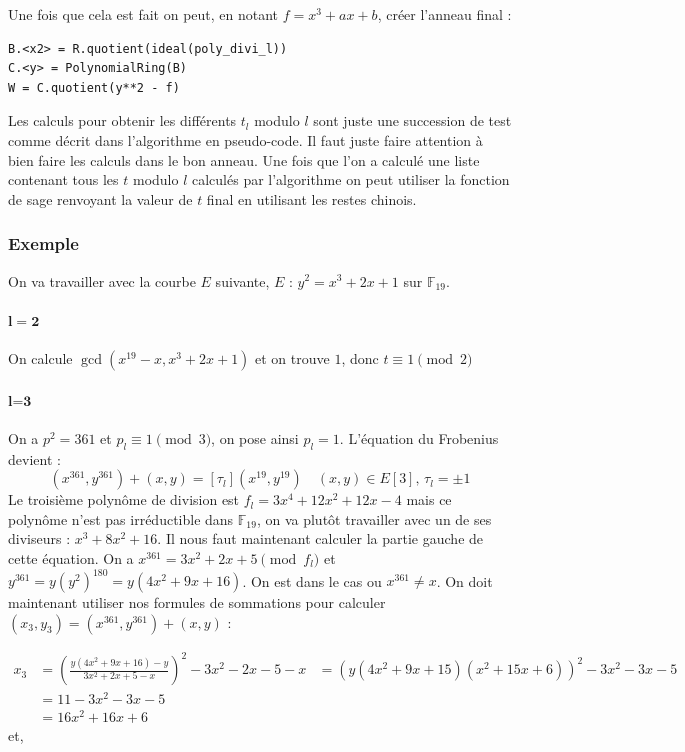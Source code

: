 \documentclass[12pt]{article}
\begin{document}
Une fois que cela est fait on peut, en notant $f=x^3 +ax+b$, créer l'anneau final :
\bigskip
\begin{lstlisting}
B.<x2> = R.quotient(ideal(poly_divi_l))
C.<y> = PolynomialRing(B)
W = C.quotient(y**2 - f)
\end{lstlisting}
\bigskip
Les calculs pour obtenir les différents $t_l$ modulo $l$ sont juste une succession de test comme décrit dans l'algorithme en pseudo-code. Il faut juste faire attention à bien faire les calculs dans le bon anneau.
Une fois que l'on a calculé une liste  contenant tous les $t$ modulo $l$ calculés par l'algorithme on peut utiliser la fonction de sage  renvoyant la valeur de $t$ final en utilisant les restes chinois.
\subsubsection{Exemple}
On va travailler avec la courbe $E$ suivante, $E$ : $y^2 =x^3 +2x+1$ sur $\mathbb{F}_{19}$.

\paragraph{$\mathbf{l=2}$}
On calcule $\gcd(x^{19} -x, x^3 + 2x+1)$ et on trouve $1$, donc $t \equiv 1 \pmod 2$

\paragraph{$\textbf{l=3}$}
On a $p^2 = 361$ et $p_l \equiv 1 \pmod 3$, on pose ainsi $p_l = 1$. L'équation du Frobenius devient : 
\begin{equation}
(x^{361}, y^{361}) + (x,y) = [\tau_l](x^{19}, y^{19})  \quad (x,y) \in E[3], \, \tau_l = \pm 1
\end{equation}
Le troisième polynôme de division est $f_l = 3x^4 + 12x^2 +12x - 4$ mais ce polynôme n'est pas irréductible dans $\mathbb{F}_{19}$, on va plutôt travailler avec un de ses diviseurs : $x^3 + 8x^2+16$.
\newline 
Il nous faut maintenant calculer la partie gauche de cette équation.
On a $x^{361} = 3x^2 +2x +5 \pmod f_{l}$ et $y^{361} = y(y^2)^{180} = y(4x^2+9x+16)$. On est dans le cas ou $x^{361} \ne x$. On doit maintenant utiliser nos formules de sommations pour calculer $(x_3, y_3) =(x^{361}, y^{361}) + (x,y)$ : 

\begin{align*}
x_3 &= (\frac{y(4x^2+9x+16) - y}{3x^2 +2x +5 - x})^2 -3x^2 -2x - 5 - x 
 	&= (y(4x^2+9x+15)(x^2+15x+6))^2 -3x^2 -3x - 5 \\
 	&= 11 - 3x^2 -3x - 5  \\
 	&= 16x^2 + 16x + 6 
\end{align*}
et, 
\end{document}
